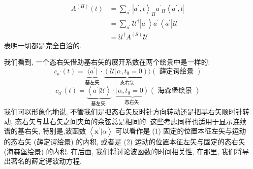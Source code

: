 \begin{equation}
	\begin{aligned}
		{A}^{\left( H\right) }\left( t\right) &= \mathop{\sum }\limits_{{a}^{\prime }}{\left| {a}^{\prime }, t\right\rangle }_{H}{a}^{\prime }{}_{H}\left\langle {{a}^{\prime }, t}\right|\\
		&= \mathop{\sum }\limits_{{a}^{\prime }}\mathcal{U}^{ \dagger }\left| {a}^{\prime }\right\rangle {a}^{\prime }\left\langle {a}^{\prime }\right|\mathcal{U}\\
		&= \mathcal{U}^{ \dagger }{A}^{\left( S\right) }\mathcal{U}
	\end{aligned}
\end{equation}
表明一切都是完全自洽的.

我们看到, 一个态右矢借助基右矢的展开系数在两个绘景中是一样的:
\begin{equation}
	c_{a^\prime}(t)=\underset{\text{基左矢}}{\underbrace{\langle a^\prime |}}\cdot\underset{\text{态右矢}}{\underbrace{ (\mathcal{U} | \alpha ,{t}_{0} = 0) \rangle }} ( \text{ 薛定谔绘景 })
\end{equation}
\begin{equation}
	{c}_{{a}^{\prime }}\left( t\right) = \underset{\text{基左矢 }}{\underbrace{\left\langle {a}^{\prime } | \mathcal{U}\right\rangle }} \cdot \underset{\text{态右矢 }}{\underbrace{\left| \alpha ,{t}_{0} = 0\right\rangle }}\left( \text{ 海森堡绘景 }\right)
\end{equation}
我们可以形象化地说, 不管我们是把态右矢反时针方向转动还是把基右矢顺时针转动, 态右矢与基右矢之间夹角的余弦总是相同的. 这些考虑同样也适用于显示连续谱的基右矢, 特别是,波函数 $\left\langle {{\mathbf{x}}^{\prime } | \alpha }\right\rangle$ 可以看作是 (1) 固定的位置本征左矢与运动的态右矢 (薛定谔绘景) 的内积, 或者是 (2) 运动的位置本征左矢与固定的态右矢 (海森堡绘景) 的内积. 在后面, 我们将讨论波函数的时间相关性, 在那里, 我们将导出著名的薛定谔波动方程.

